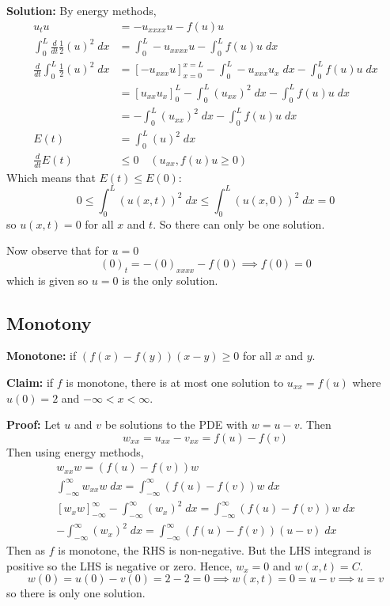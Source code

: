 \documentclass[10pt]{article}
\begin{document}
\textbf{Solution:}
By energy methods,
\begin{align*}
    u_t u &= -u_{xxxx} u - f(u)u\\
    \int_0^L \frac{d}{dt} \frac{1}{2}(u)^2\; dx &= \int_0^L -u_{xxxx} u - \int_0^L f(u)u\; dx\\
    \frac{d}{dt}\int_0^L \frac{1}{2}(u)^2\; dx &= [-u_{xxx}u]_{x=0}^{x=L} - \int_0^L -u_{xxx}u_x \; dx - \int_0^L f(u)u\; dx\\
    &= [u_{xx}u_x]_0^L - \int_0^L (u_{xx})^2\; dx - \int_0^L f(u)u\; dx\\
    &=-\int_0^L (u_{xx})^2\; dx - \int_0^L f(u)u\; dx\\
    E(t) &= \int_0^L (u)^2\; dx\\
    \frac{d}{dt}E(t) &\leq 0 \quad (u_{xx}, f(u)u \geq 0)
\end{align*}
Which means that $E(t) \leq E(0)$:
\[ 0 \leq \int_0^L (u(x, t))^2\; dx \leq \int_0^L (u(x, 0))^2\; dx = 0\]
so $u(x, t) = 0$ for all $x$ and $t$. So there can only be one solution.

Now observe that for $u = 0$
\[(0)_t = -(0)_{xxxx} - f(0) \implies f(0) = 0\]
which is given so $u = 0$ is the only solution.
\subsection{Monotony}
\textbf{Monotone:} if $(f(x) - f(y))(x - y) \geq 0$ for all $x$ and $y$. 

\textbf{Claim:} if $f$ is monotone, there is at most one solution to $u_{xx} = f(u)$ where $u(0) = 2$ and $-\infty < x< \infty$. 

\textbf{Proof:} Let $u$ and $v$ be solutions to the PDE with $w = u -v$. Then 
\[w_{xx} = u_{xx} - v_{xx} = f(u) - f(v)\]
Then using energy methods, 
\begin{gather*}
    w_{xx}w = (f(u) - f(v))w\\
    \int_{-\infty}^{\infty} w_{xx}w \; dx = \int_{-\infty}^{\infty} (f(u) - f(v))w\; dx\\
    [w_xw]_{-\infty}^\infty - \int_{-\infty}^{\infty} (w_x)^2\; dx = \int_{-\infty}^{\infty} (f(u) - f(v))w\; dx\\
    - \int_{-\infty}^{\infty} (w_x)^2\; dx = \int_{-\infty}^{\infty} (f(u) - f(v))(u - v)\; dx
\end{gather*}
Then as $f$ is monotone, the RHS is non-negative. But the LHS integrand is positive so the LHS is negative or zero. Hence, $w_x = 0$ and $w(x, t) = C$. 
\[w(0) = u(0) - v(0) = 2- 2 = 0\implies w(x, t) = 0= u -v \implies u = v\]
so there is only one solution. 
\end{document}
